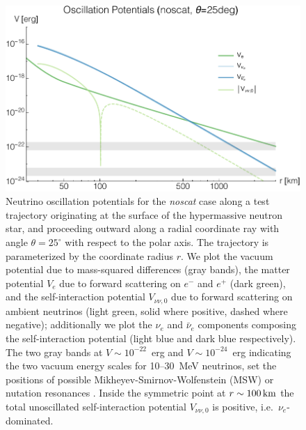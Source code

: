 \documentclass[aps,floatfix,prd,superscriptaddress,twocolumn]{revtex4-1}
\begin{document}
\begin{figure}
  \includegraphics[width=\columnwidth]{20180615-potentials-Ve_Vnue_Vnua_Vnu-000Mo-025deg-noscat}
  \caption{Neutrino oscillation potentials
    for the \emph{noscat} case
    along a test trajectory
    originating at the surface of the hypermassive neutron star, and
    proceeding outward along a radial coordinate ray with angle
    $\theta=25^{\circ}$ with respect to the polar axis.
    The trajectory is parameterized by the coordinate radius $r$.
    We plot the vacuum potential due to mass-squared differences (gray bands),
    the matter potential $V_e$ due to forward scattering on $e^-$ and $e^+$
    (dark green),
    and the self-interaction potential $V_{\nu\nu,0}$ due to forward
    scattering on ambient neutrinos (light green, solid where positive,
    dashed where negative);
    additionally we plot the $\nu_e$ and $\bar{\nu}_e$ components composing
    the self-interaction potential (light blue and dark blue respectively).
    The two gray bands at $V\sim10^{-22}$~erg and $V\sim10^{-24}$~erg
    indicating the two vacuum energy scales for 10--30~MeV neutrinos,
    set the positions of possible Mikheyev-Smirnov-Wolfenstein (MSW)
    or nutation resonances \cite{malk2012-mnr_1}.
    Inside the symmetric point at $r\sim100\,{\rm km}$ the total unoscillated
    self-interaction potential $V_{\nu\nu,0}$ is positive,
    i.e.\ $\nu_e$-dominated.
    }
  \label{fig:V_nunu-noscat}
\end{figure}
\end{document}

